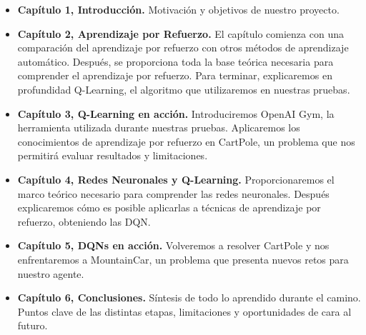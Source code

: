 \begin{itemize}
    \item \textbf{Capítulo 1, Introducción.} Motivación y objetivos de nuestro proyecto.
    \item \textbf{Capítulo 2, Aprendizaje por Refuerzo.} El capítulo comienza con una comparación del aprendizaje por refuerzo con otros métodos de aprendizaje automático. Después, se proporciona toda la base teórica necesaria para comprender el aprendizaje por refuerzo. Para terminar, explicaremos en profundidad Q-Learning, el algoritmo que utilizaremos en nuestras pruebas.
    \item \textbf{Capítulo 3, Q-Learning en acción.} Introduciremos OpenAI Gym, la herramienta utilizada durante nuestras pruebas. Aplicaremos los conocimientos de aprendizaje por refuerzo en CartPole, un problema que nos permitirá evaluar resultados y limitaciones.
    \item \textbf{Capítulo 4, Redes Neuronales y Q-Learning.} Proporcionaremos el marco teórico necesario para comprender las redes neuronales. Después explicaremos cómo es posible aplicarlas a técnicas de aprendizaje por refuerzo, obteniendo las DQN.
    \item \textbf{Capítulo 5, DQNs en acción.} Volveremos a resolver CartPole y nos enfrentaremos a MountainCar, un problema que presenta nuevos retos para nuestro agente.
    \item \textbf{Capítulo 6, Conclusiones.} Síntesis de todo lo aprendido durante el camino. Puntos clave de las distintas etapas, limitaciones y oportunidades de cara al futuro.
    
\end{itemize}
